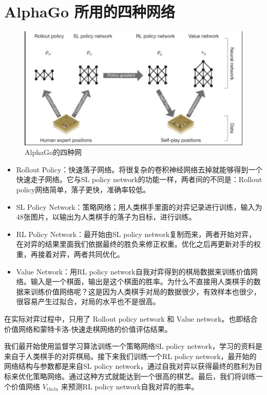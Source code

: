 \documentclass[12pt]{article}
\begin{document}
\section{AlphaGo 所用的四种网络}
\begin{figure}[ht]
  \centering
  \includegraphics[width=.8\textwidth]{fig/AlphaGo的四种网络.png} %
  \caption{AlphaGo的四种网} %
\end{figure}

\begin{itemize}[itemindent=2em]
    \item Rollout Policy：快速落子网络。将很复杂的卷积神经网络去掉就能够得到一个快速走子网络。它与SL policy network的功能一样，两者间的不同是：Rollout policy网络简单，落子更快，准确率较低。
    
    \item SL Policy Network：策略网络；用人类棋手里面的对弈记录进行训练，输入为48张图片，以输出为人类棋手的落子为目标，进行训练。
    
    \item RL Policy Network：最开始由SL policy network复制而来，两者开始对弈，在对弈的结果里面我们依据最终的胜负来修正权重。优化之后再更新对手的权重，再接着对弈，两者共同优化。
    
    \item Value Network：用RL policy network自我对弈得到的棋局数据来训练价值网络。输入是一个棋面，输出是这个棋面的胜率。为什么不直接用人类棋手的数据来训练价值网络呢？这是因为人类棋手对局的数据很少，有效样本也很少，很容易产生过拟合，对局的水平也不是很高。
\end{itemize}

在实际对弈过程中，只用了 Rollout policy network 和 Value network。也即结合价值网络和蒙特卡洛-快速走棋网络的价值评估结果。

我们最开始使用监督学习算法训练一个策略网络SL policy network，学习的资料是来自于人类棋手的对弈棋局。接下来我们训练一个RL policy network，最开始的网络结构与参数都是来自SL policy network，通过自我对弈以获得最终的胜利为目标来优化策略网络。通过这种方式就能达到一个很高的棋艺。最后，我们将训练一个价值网络 $V_{theta}$ 来预测RL policy network自我对弈的胜率。
\end{document}
